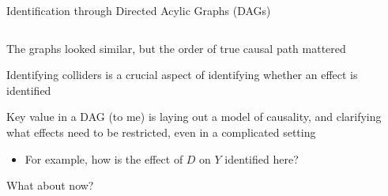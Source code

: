 \documentclass[notes,11pt, aspectratio=169]{beamer}
\newenvironment{wideitemize}{\itemize\addtolength{\itemsep}{10pt}}{\enditemize}
\begin{document}
\begin{frame}{Identification through Directed Acylic Graphs (DAGs)}
\begin{columns}[T] %
  \begin{column}{.6\textwidth}
    \begin{wideitemize}
    \item<1-> The graphs looked similar, but the order of true causal path
      mattered
    \item<2-> Identifying colliders is a crucial aspect of identifying
      whether an effect is identified
    \item<3-> Key value in a DAG (to me) is laying out a model of
      causality, and clarifying what effects need to be restricted, even in a complicated setting
      \begin{itemize}
      \item For example, how is the effect of $D$ on $Y$ identified here?
      \end{itemize}
    \item<4-> What about now?
    \end{wideitemize}
  \end{column}%
  \hfill%
  \begin{column}{.5\textwidth}
    \begin{center}
\end{center}
\end{column}
\end{columns}
\end{frame}
\end{document}

